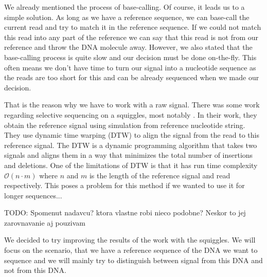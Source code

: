 
We already mentioned the process of base-calling. Of course, it leads us to a simple
solution. As long as we have a reference sequence, we can base-call the current read
and try to match it in the reference sequence. If we could not match this read
into any part of the reference we can say that this read is not from our reference
and throw the DNA molecule away. However, we also stated that the base-calling process
is quite slow and our decision must be done on-the-fly. This often means we don't
have time to turn our signal into a nucleotide sequence as the reads are too short for this
and can be already sequenced when we made our decision.

That is the reason why we have to work with a raw signal. There was some work
regarding selective sequencing on a squiggles, most notably \cite{loose2016real}. In their
work, they obtain the reference signal using simulation from reference nucleotide
string. They use dynamic time warping (DTW) to align the signal from the read to
this reference signal. The DTW is a dynamic programming algorithm that takes two signals and aligns them in a
way that minimizes the total number of insertions and deletions. One of the limitations
of DTW is that it has run time complexity $\mathcal{O}(n\cdot m)$ where $n$ and $m$
is the length of the reference signal and read respectively. This poses a problem
for this method if we wanted to use it for longer sequences...

TODO: Spomenut nadavcu? ktora vlastne robi nieco podobne? Neskor to jej zarovnavanie
aj pouzivam

We decided to try improving the results of the work with the squiggles. We will
focus on the scenario, that we have a reference sequence of the DNA we want to
sequence and we will mainly try to distinguish between signal from this DNA and
not from this DNA.
